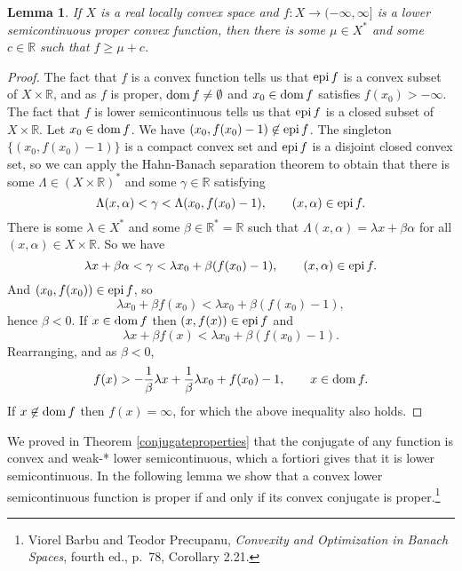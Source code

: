 \documentclass{article}
\newcommand{\epi}{\ensuremath\mathrm{epi}\,}
\newcommand{\dom}{\ensuremath\mathrm{dom}\,}
\newtheorem{lemma}[theorem]{Lemma}
\theoremstyle{definition}
\begin{document}
\begin{lemma}
If $X$ is a real locally convex space and $f:X \to (-\infty,\infty]$ is a lower semicontinuous proper convex function, then there is some
$\mu \in X^*$ and some $c \in \mathbb{R}$ such that $f \geq \mu+c$.
\label{affine}
\end{lemma}
\begin{proof}
The fact that $f$ is a convex function tells us that $\epi f$ is a convex subset of $X \times \mathbb{R}$, and as $f$ is proper,
$\dom f \neq \emptyset$ and $x_0 \in \dom f$ satisfies $f(x_0)>-\infty$.
The fact that $f$ is lower semicontinuous tells us that $\epi f$ is a closed subset of $X \times \mathbb{R}$.
Let $x_0 \in \dom f$. We have $(x_0,f(x_0)-1) \not \in \epi f$. The singleton $\{(x_0,f(x_0)-1)\}$ is a compact convex
set and $\epi f$ is a disjoint closed convex set, so we can apply the Hahn-Banach separation theorem to obtain that there is some $\Lambda \in
(X \times \mathbb{R})^*$
and some $\gamma \in \mathbb{R}$ satisfying
\[
\Lambda (x,\alpha) < \gamma < \Lambda (x_0,f(x_0)-1), \qquad (x,\alpha) \in \epi f.
\]
There is some $\lambda \in X^*$ and some $\beta \in \mathbb{R}^*=\mathbb{R}$ such that $\Lambda(x,\alpha ) =\lambda x + \beta \alpha$
for all $(x,\alpha) \in X \times \mathbb{R}$.
So we have
\[
 \lambda x + \beta \alpha < \gamma<\lambda x_0 + \beta(f(x_0)-1), \qquad (x,\alpha) \in \epi f.
\]
And $(x_0,f(x_0)) \in \epi f$, so
\[
\lambda x_0 + \beta f(x_0)<\lambda x_0 + \beta ( f(x_0)-1),
\]
hence $\beta<0$. If $x \in \dom f$ then $(x,f(x)) \in \epi f$ and
\[
\lambda x + \beta f(x) < \lambda x_0 + \beta (f(x_0)-1).
\]
Rearranging, and as $\beta<0$,
\[
f(x) > -\frac{1}{\beta}\lambda x +\frac{1}{\beta}\lambda x_0+ f(x_0)-1, \qquad x \in \dom f.
\]
If $x \not \in \dom f$ then  $f(x) = \infty$, for which the above inequality also holds.
\end{proof}



We proved in Theorem \ref{conjugateproperties} that the conjugate of any
function is  convex and   weak-* lower semicontinuous, which a fortiori gives that it is lower semicontinuous.
In the following lemma we show that  a convex lower semicontinuous
function is proper if and only if its convex conjugate is proper.\footnote{Viorel Barbu and Teodor Precupanu, {\em Convexity and Optimization in Banach Spaces}, fourth ed., p.~78, Corollary 2.21.}
\end{document}
